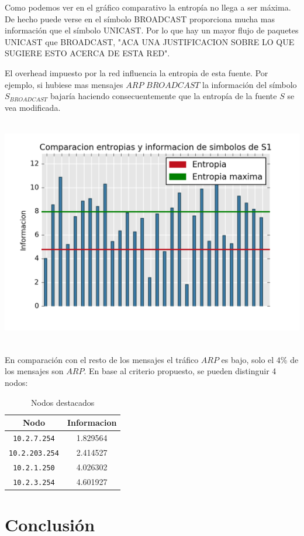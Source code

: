 \documentclass[a4paper, 10pt, twoside]{article}
\begin{document}
Como podemos ver en el gráfico comparativo la entropía no llega a ser máxima. De hecho puede verse en el símbolo BROADCAST proporciona mucha mas información que el símbolo UNICAST. Por lo que hay un mayor flujo de paquetes UNICAST que BROADCAST, "ACA UNA JUSTIFICACION SOBRE LO QUE SUGIERE ESTO ACERCA DE ESTA RED". 

El overhead impuesto por la red influencia la entropia de esta fuente. Por ejemplo, si hubiese mas mensajes $ARP$ $BROADCAST$ la información del símbolo $S_{BROADCAST}$ bajaría haciendo consecuentemente que la entropía de la fuente $S$ se vea modificada.

\includegraphics[height=10cm]{grafico2-red-labos.png} 

En comparación con el resto de los mensajes el tráfico $ARP$ es bajo, solo el 4\% de los mensajes son $ARP$. En base al criterio propuesto, se pueden distinguir 4 nodos:   

    \begin{table}[ht]\begin{center}
      \begin{tabular}{|c|c|}
      \hline
      \textbf{Nodo} & \textbf{Informacion} \\ \hline
      \texttt{10.2.7.254}& 1.829564 \\ \hline
      \texttt{10.2.203.254}& 2.414527 \\ \hline
      \texttt{10.2.1.250}& 4.026302 \\ \hline
      \texttt{10.2.3.254}& 4.601927 \\ \hline
      \end{tabular}
      \caption{Nodos destacados}
      \label{Nodos-destacados}
    \end{center}\end{table}

\section{Conclusión}
\end{document}
